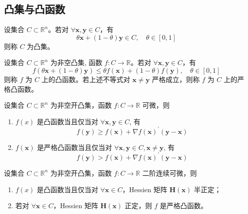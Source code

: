 \documentclass[cn,mtpro2,12pt]{elegantbook}
\begin{document}
\subsection{凸集与凸函数}

\begin{definition}[凸集]
    设集合 $C\subset\mathbb{R}^{n}$。若对 $\forall\mathbf{x},\mathbf{y}\in C$，有
    \begin{equation}
        \theta \mathbf{x}+(1-\theta)\mathbf{y}\in C,\quad\theta\in[0,1]
    \end{equation}
    则称 $C$ 为凸集。
\end{definition}

\begin{definition}[凸函数]
    设集合 $C\subset\mathbb{R}^{n}$ 为非空凸集, 函数 $f:C\rightarrow\mathbb{R}$。若对 $\forall\mathbf{x},\mathbf{y}\in C$，有
    \begin{equation}
        f(\theta\mathbf{x}+(1-\theta)\mathbf{y})\leq\theta f(\mathbf{x})+(1-\theta)f(\mathbf{y}),\quad\theta\in[0,1]
    \end{equation}
    则称 $f$ 为 $C$ 上的凸函数。若上述不等式对 $\mathbf{x}\neq\mathbf{y}$ 严格成立，则称 $f$ 为 $C$ 上的严格凸函数。
\end{definition}

\begin{theorem}[凸函数的一阶判定条件]
    设集合 $C\subset\mathbb{R}^{n}$ 为非空开凸集，函数 $f:C\rightarrow\mathbb{R}$ 可微，则
    \begin{enumerate}
        \item $f(x)$ 是凸函数当且仅当对 $\forall\mathbf{x},\mathbf{y}\in C$, 有
              \begin{equation}
                  f(\mathbf{y})\geq f(\mathbf{x})+\nabla f(\mathbf{x})^{\prime}(\mathbf{y}-\mathbf{x})
              \end{equation}
        \item $f(\mathbf{x})$ 是严格凸函数当且仅当对 $\forall\mathbf{x},\mathbf{y}\in C,\mathbf{x}\neq\mathbf{y}$, 有
              \begin{equation}
                  f(\mathbf{y})>f(\mathbf{x})+\nabla f(\mathbf{x})^{\prime}(\mathbf{y}-\mathbf{x})
              \end{equation}
    \end{enumerate}
\end{theorem}

\begin{theorem}[凸函数的二阶判定条件]
    设集合 $C\subset\mathbb{R}^{n}$ 为非空开凸集，函数 $f:C\rightarrow\mathbb{R}$ 二阶连续可微，则
    \begin{enumerate}
        \item $f(x)$ 是凸函数当且仅当对 $\forall\mathbf{x}\in C$，Hessien 矩阵 $\boldsymbol{H}(\mathbf{x})$ 半正定；
        \item 若对 $\forall\mathbf{x}\in C$，Hessien 矩阵 $\boldsymbol{H}(\mathbf{x})$ 正定，则 $f$ 是严格凸函数。
    \end{enumerate}
\end{theorem}
\end{document}
